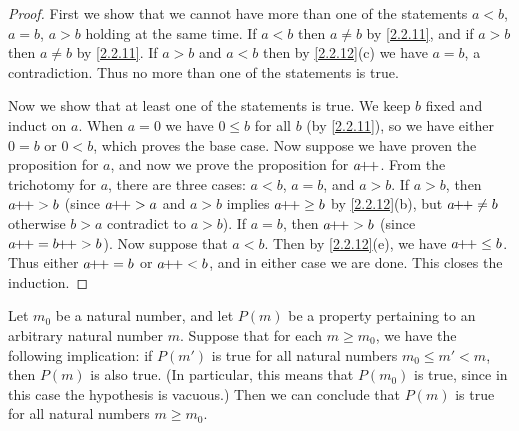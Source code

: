 \begin{proof}
  First we show that we cannot have more than one of the statements \(a < b\), \(a = b\), \(a > b\) holding at the same time.
  If \(a < b\) then \(a \neq b\) by \cref{2.2.11}, and if \(a > b\) then \(a \neq b\) by \cref{2.2.11}.
  If \(a > b\) and \(a < b\) then by \cref{2.2.12}(c) we have \(a = b\), a contradiction.
  Thus no more than one of the statements is true.

  Now we show that at least one of the statements is true.
  We keep \(b\) fixed and induct on \(a\).
  When \(a = 0\) we have \(0 \leq b\) for all \(b\) (by \cref{2.2.11}), so we have either \(0 = b\) or \(0 < b\), which proves the base case.
  Now suppose we have proven the proposition for \(a\), and now we prove the proposition for \(a\!\!+\!\!+\).
  From the trichotomy for \(a\), there are three cases: \(a < b\), \(a = b\), and \(a > b\).
  If \(a > b\), then \(a\!\!+\!\!+ > b\) (since \(a\!\!+\!\!+ > a\) and \(a > b\) implies \(a\!\!+\!\!+ \geq b\) by \cref{2.2.12}(b), but \(a\!\!+\!\!+ \neq b\) otherwise \(b > a\) contradict to \(a > b\)).
  If \(a = b\), then \(a\!\!+\!\!+ > b\) (since \(a\pp = b\pp > b\)).
  Now suppose that \(a < b\).
  Then by \cref{2.2.12}(e), we have \(a\!\!+\!\!+ \leq b\).
  Thus either \(a\!\!+\!\!+ = b\) or \(a\!\!+\!\!+ < b\), and in either case we are done.
  This closes the induction.
\end{proof}

\begin{prop}\label{2.2.14}
  Let \(m_0\) be a natural number, and let \(P(m)\) be a property pertaining to an arbitrary natural number \(m\).
  Suppose that for each \(m \geq m_0\), we have the following implication: if \(P(m')\) is true for all natural numbers \(m_0 \leq m' < m\), then \(P(m)\) is also true.
  (In particular, this means that \(P(m_0)\) is true, since in this case the hypothesis is vacuous.)
  Then we can conclude that \(P(m)\) is true for all natural numbers \(m \geq m_0\).
\end{prop}

